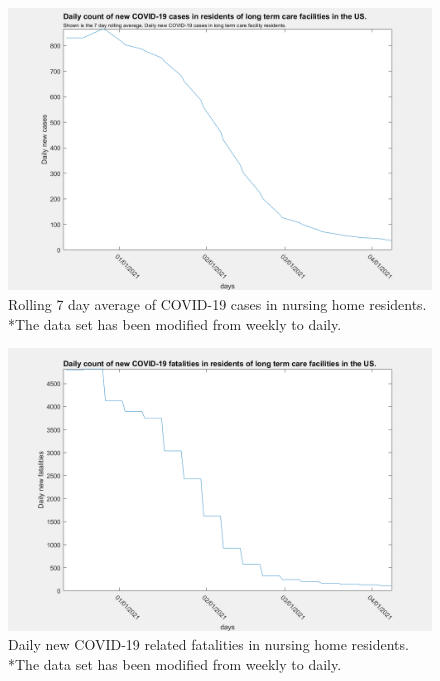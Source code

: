 \documentclass[twoside]{article}
\begin{document}
\begin{multicols}{2}
\begin{figure}[H]
	\includegraphics[width=\linewidth]{images/usa_daily_ltc_cases_processed.png}
	\caption{Rolling 7 day average of COVID-19 cases in nursing home residents. *The data set has been modified from weekly to daily.}
	\label{fig:images/usa_daily_ltc_cases_processedLabel}
\end{figure}

\begin{figure}[H]
	\includegraphics[width=\linewidth]{images/usa_daily_ltc_fatalities_unprocessed.png}
	\caption{Daily new COVID-19 related fatalities in nursing home residents. *The data set has been modified from weekly to daily.}
	\label{fig:images/usa_daily_ltc_fatalities_unprocessedLabel}
\end{figure}


\end{multicols}
\end{document}
